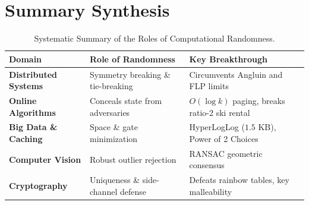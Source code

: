 \documentclass[11pt,a4paper]{article}
\begin{document}
\section{Summary Synthesis}
\begin{table}[h!]
\centering
\small
\begin{tabular}{@{}lll@{}}
\toprule
\textbf{Domain} & \textbf{Role of Randomness} & \textbf{Key Breakthrough} \\ \midrule
\textbf{Distributed Systems} & Symmetry breaking \& tie-breaking & Circumvents Angluin and FLP limits \\
\textbf{Online Algorithms} & Conceals state from adversaries & $O(\log k)$ paging, breaks ratio-2 ski rental \\
\textbf{Big Data \& Caching} & Space \& gate minimization & HyperLogLog ($1.5\text{ KB}$), Power of 2 Choices \\
\textbf{Computer Vision} & Robust outlier rejection & RANSAC geometric consensus \\
\textbf{Cryptography} & Uniqueness \& side-channel defense & Defeats rainbow tables, key malleability \\
\bottomrule
\end{tabular}
\caption{Systematic Summary of the Roles of Computational Randomness.}
\end{table}
\end{document}
